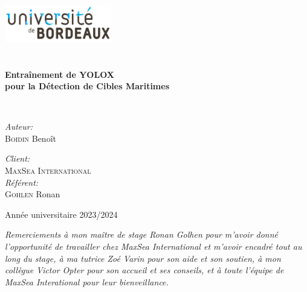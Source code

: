 \begin{titlepage}
    \begin{center}
    
    \includegraphics[width=0.35\textwidth]{./img/univ_bordeaux_logo.png}~\\[1cm]    
    \textsc{\Large }\\[0.5cm]
    
    \HRule \\[0.4cm]
    
    {\huge \bfseries Entraînement de YOLOX \\
    pour la Détection de Cibles Maritimes\\[0.4cm] }
    
    \HRule \\[1.5cm]
    
    \begin{minipage}{0.4\textwidth}
    \begin{flushleft} \large
    \emph{Auteur:}\\
    \textsc{Boidin} Benoît
    \end{flushleft}
    \end{minipage}
    \begin{minipage}{0.4\textwidth}
    \begin{flushright} \large
    \emph{Client:} \\
    \textsc{MaxSea International}\\
    \emph{Référent:} \\
    \textsc{Gohlen} Ronan
    \end{flushright}
    \end{minipage}
    
    \vfill
    
    {\large Année universitaire 2023/2024}
    
    \end{center}


    \pagebreak

    \vspace*{\fill}

    \textit{Remerciements à mon maître de stage Ronan Golhen pour m'avoir donné l'opportunité de travailler chez MaxSea International
    et m'avoir encadré tout au long du stage, 
    à ma tutrice Zoé Varin pour son aide et son soutien, 
    à mon collègue Victor Opter pour son accueil et ses conseils, 
    et à toute l'équipe de MaxSea Interational pour leur bienveillance. }

\end{titlepage}